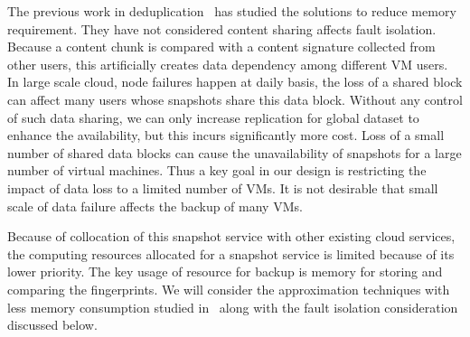 \begin{itemize}
The previous work in deduplication~\cite{extreme_binning09,sparseindex09} has
studied the solutions  to reduce memory requirement.
They have not considered content sharing affects
fault isolation.
Because a content chunk is compared with a content signature collected from other users,
this artificially creates data dependency among different VM users.
In large scale cloud, node failures happen at daily basis,
the loss of a shared block can affect many users whose snapshots share this 
data block. 
Without any control of such data sharing, we can only increase  
replication for global dataset to enhance the availability,
but this incurs significantly more cost.
Loss of a small number of  shared data blocks can 
cause the unavailability of snapshots for a large number of virtual machines.
Thus a key goal  in our design
is restricting the impact of  data loss to a limited number of VMs. 
It is not desirable that small scale of data failure affects the backup of many VMs.

\end{itemize}

Because of collocation of this snapshot service with other existing cloud services, 
the computing resources allocated for a snapshot service is limited
because of its lower priority.  
The key usage of resource for backup is memory for storing and comparing the fingerprints. 
We will consider the approximation techniques with less memory consumption
studied in~\cite{extreme_binning09,Guo2011} along with the fault isolation consideration discussed below. 

